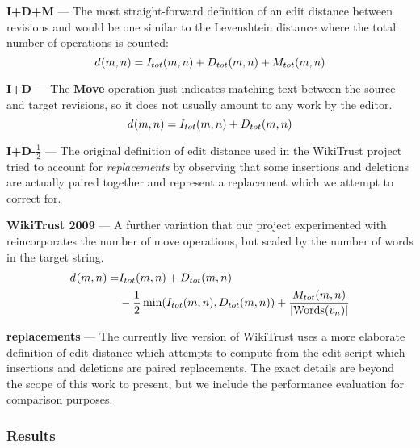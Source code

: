 \begin{description}
\item{\textbf{I+D+M}} --- The most straight-forward definition of an edit
        distance between revisions  and  would be one
        similar to the Levenshtein distance where
        the total number of operations is counted:
        \begin{equation}
            \dist{}{m,n} = I_{tot}(m,n) + D_{tot}(m,n) + M_{tot}(m,n)
        \label{eq:dist-idm}
        \end{equation}
\item{\textbf{I+D}} --- The \textbf{Move} operation just indicates
        matching text between the source and target revisions,
        so it does not usually amount to any work by the editor.
        \begin{equation}
            \dist{}{m,n} = I_{tot}(m,n) + D_{tot}(m,n)
        \label{eq:dist-id}
        \end{equation}
\item{\textbf{I+D-$\frac{1}{2}$}} --- The original definition of edit
        distance used in the WikiTrust project tried to account for
        \textit{replacements} by observing that some insertions and
        deletions are actually paired together and represent a
        replacement which we attempt to correct for.
\item{\textbf{WikiTrust 2009}} --- A further variation that our
        project experimented with reincorporates the number of
        move operations, but scaled by the number of words in
        the target string.
        \begin{align}
            d_{}(m,n) =& I_{tot}(m,n) + D_{tot}(m,n) \\
                & - \frac{1}{2}\min(I_{tot}(m,n), D_{tot}(m,n))
                + \frac{M_{tot}(m,n)}{| \mathrm{Words}(v_{n}) |}
        \end{align}
\item{\textbf{replacements}} --- The currently live version of
        WikiTrust uses a more elaborate definition of edit distance
        which attempts to compute from the edit script
        which insertions and deletions
        are paired replacements.
        The exact details are beyond the scope of this work to present,
        but we include the performance evaluation for comparison purposes.
\end{description}

\subsubsection{Results}

